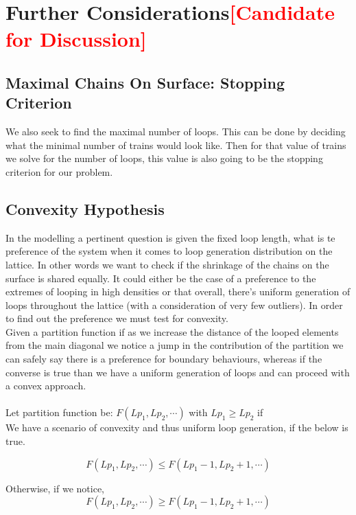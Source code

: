 \documentclass[10pt,letterpaper]{article}
\begin{document}
\newpage
\section*{Further Considerations\textcolor{red}{[Candidate for Discussion]}}
\subsection*{Maximal Chains On Surface: Stopping Criterion}

We also seek to find the maximal number of loops. This can be done by deciding what the minimal number of trains would look like. Then for that value of trains we solve for the number of loops, this value is also going to be the stopping criterion for our problem.



\subsection*{Convexity Hypothesis}
In the modelling a pertinent question is given the fixed loop length, what is te preference of the system when it comes to loop generation distribution on the lattice. In other words we want to check if the shrinkage of the chains on the surface is shared equally. It could either be the case of a preference to the extremes of looping in high densities or that overall, there's uniform generation of loops throughout the lattice (with a consideration of very few outliers). In order to find out the preference we must test for convexity.\\

\noindent Given a partition function if as we increase the distance of the looped elements from the main diagonal we notice a jump in the contribution of the partition we can safely say there is a preference for boundary behaviours, whereas if the converse is true than we have a uniform generation of loops and can proceed with a convex approach.\\\\

\noindent Let partition function be: $F(Lp_1,Lp_2, \cdots)$ with $Lp_1\geq Lp_2$ if\\

\noindent We have a scenario of convexity and thus uniform loop generation, if the below is true.

$$F(Lp_1,Lp_2, \cdots)\leq F(Lp_1-1,Lp_2+1, \cdots)$$

\noindent Otherwise, if we notice,
$$F(Lp_1,Lp_2, \cdots)\geq F(Lp_1-1,Lp_2+1, \cdots)$$ 
\end{document}
